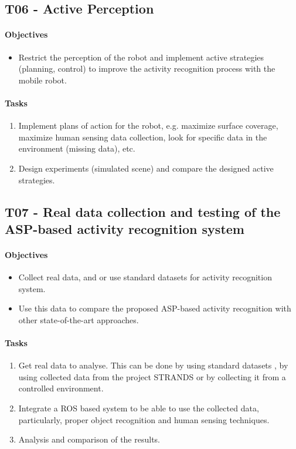 \subsection*{T06 - Active Perception}
\paragraph{Objectives}
\begin{itemize}
\item Restrict the perception of the robot and implement active strategies (planning, control) to improve the activity recognition process with the mobile robot.
\end{itemize}
\paragraph{Tasks}
\begin{enumerate}[label= T06-\Alph*:]
\item Implement plans of action for the robot, e.g. maximize surface coverage, maximize human sensing data collection, look for specific data in the environment (missing data), etc.
\item Design experiments (simulated scene) and compare the designed active strategies.
\end{enumerate}

\subsection*{T07 - Real data collection and testing of the ASP-based activity recognition system}
\paragraph{Objectives}
\begin{itemize}
\item Collect real data, and or use standard datasets for activity recognition system.
\item Use this data to compare the proposed ASP-based activity recognition with other state-of-the-art approaches.
\end{itemize}
\paragraph{Tasks}
\begin{enumerate}[label= T07-\Alph*:]
\item Get real data to analyse. This can be done by using standard datasets \citep{Tenorth2009_TUMKData,Liu2011_BenchmarkDatasHAR}, by using collected data from the project STRANDS \citep{Hawes2013_STRANDS} or by collecting it from a controlled environment.
\item Integrate a ROS based system to be able to use the collected data, particularly, proper object recognition and human sensing techniques.
\item Analysis and comparison of the results.
\end{enumerate}

